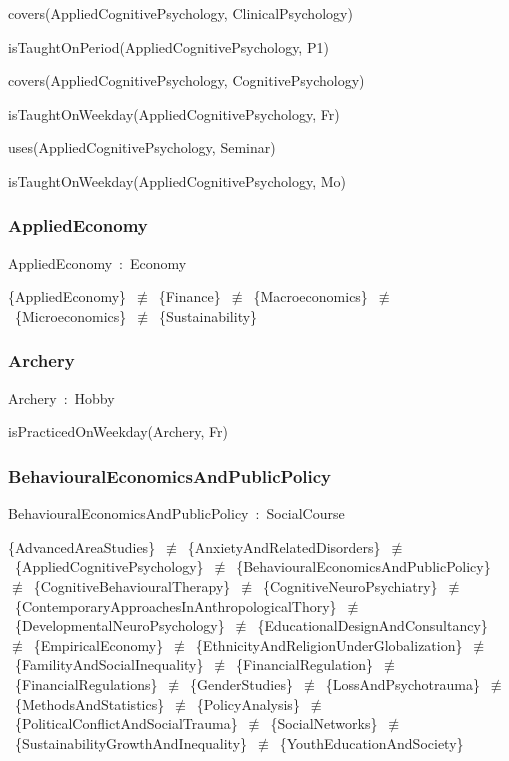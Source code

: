 \documentclass{article}
\begin{document}
covers(AppliedCognitivePsychology, ClinicalPsychology)

isTaughtOnPeriod(AppliedCognitivePsychology, P1)

covers(AppliedCognitivePsychology, CognitivePsychology)

isTaughtOnWeekday(AppliedCognitivePsychology, Fr)

uses(AppliedCognitivePsychology, Seminar)

isTaughtOnWeekday(AppliedCognitivePsychology, Mo)

\subsubsection*{AppliedEconomy}

AppliedEconomy~:~Economy

\{AppliedEconomy\}~\ensuremath{\not\equiv}~\{Finance\}~\ensuremath{\not\equiv}~\{Macroeconomics\}~\ensuremath{\not\equiv}~\{Microeconomics\}~\ensuremath{\not\equiv}~\{Sustainability\}

\subsubsection*{Archery}

Archery~:~Hobby

isPracticedOnWeekday(Archery, Fr)

\subsubsection*{BehaviouralEconomicsAndPublicPolicy}

BehaviouralEconomicsAndPublicPolicy~:~SocialCourse

\{AdvancedAreaStudies\}~\ensuremath{\not\equiv}~\{AnxietyAndRelatedDisorders\}~\ensuremath{\not\equiv}~\{AppliedCognitivePsychology\}~\ensuremath{\not\equiv}~\{BehaviouralEconomicsAndPublicPolicy\}~\ensuremath{\not\equiv}~\{CognitiveBehaviouralTherapy\}~\ensuremath{\not\equiv}~\{CognitiveNeuroPsychiatry\}~\ensuremath{\not\equiv}~\{ContemporaryApproachesInAnthropologicalThory\}~\ensuremath{\not\equiv}~\{DevelopmentalNeuroPsychology\}~\ensuremath{\not\equiv}~\{EducationalDesignAndConsultancy\}~\ensuremath{\not\equiv}~\{EmpiricalEconomy\}~\ensuremath{\not\equiv}~\{EthnicityAndReligionUnderGlobalization\}~\ensuremath{\not\equiv}~\{FamilityAndSocialInequality\}~\ensuremath{\not\equiv}~\{FinancialRegulation\}~\ensuremath{\not\equiv}~\{FinancialRegulations\}~\ensuremath{\not\equiv}~\{GenderStudies\}~\ensuremath{\not\equiv}~\{LossAndPsychotrauma\}~\ensuremath{\not\equiv}~\{MethodsAndStatistics\}~\ensuremath{\not\equiv}~\{PolicyAnalysis\}~\ensuremath{\not\equiv}~\{PoliticalConflictAndSocialTrauma\}~\ensuremath{\not\equiv}~\{SocialNetworks\}~\ensuremath{\not\equiv}~\{SustainabilityGrowthAndInequality\}~\ensuremath{\not\equiv}~\{YouthEducationAndSociety\}
\end{document}
